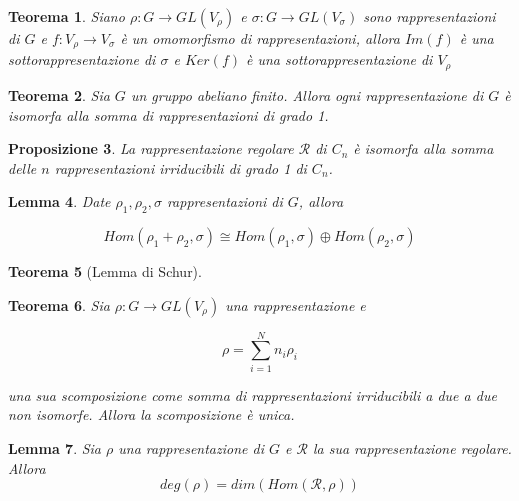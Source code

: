 \documentclass[11pt]{article}
\theoremstyle{plain}
\newtheorem{thm}{Teorema}[section]
\newtheorem{lemma}[thm]{Lemma}
\newtheorem{prop}[thm]{Proposizione}
\theoremstyle{definition}
\theoremstyle{remark}
\newcommand{\dsum}{\displaystyle\sum}
\begin{document}
\begin{thm} Siano $\rho: G \to GL(V_\rho)$ e $\sigma: G \to GL(V_\sigma)$ sono rappresentazioni di $G$ e $f: V_\rho \to V_\sigma$ è un omomorfismo di rappresentazioni, allora $Im(f)$ è una sottorappresentazione di $\sigma$ e $Ker(f)$ è una sottorappresentazione di $V_\rho$

\end{thm}





\begin{thm}Sia $G$ un gruppo abeliano finito. Allora ogni rappresentazione di $G$ è isomorfa alla somma di rappresentazioni di grado 1.



\end{thm}


\begin{prop} La rappresentazione regolare $\mathcal{R}$ di $C_n$ è isomorfa alla somma delle $n$ rappresentazioni irriducibili di grado 1 di $C_n$.

\end{prop}


\begin{lemma}
Date $\rho_1, \rho_2, \sigma$ rappresentazioni di $G$, allora

\[Hom(\rho_1 + \rho_2, \sigma) \cong Hom(\rho_1, \sigma) \oplus Hom(\rho_2, \sigma)\]

\end{lemma}


\begin{thm}[Lemma di Schur]


\end{thm}



\begin{thm}
Sia $\rho: G \to GL(V_\rho)$ una rappresentazione e 

\[\rho = \dsum_{i=1}^N n_i \rho_i \]

una sua scomposizione come somma di rappresentazioni irriducibili a due a due non isomorfe. Allora la scomposizione è unica.
\end{thm}



\begin{lemma}
Sia $\rho$ una rappresentazione di $G$ e $\mathcal{R}$ la sua rappresentazione regolare. Allora 
\[deg(\rho) = dim(Hom(\mathcal{R}, \rho))\]
\end{lemma}
\end{document}
